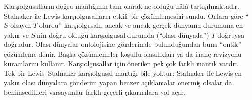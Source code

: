 Karşıolgusalların doğru mantığının tam olarak ne olduğu hâlâ tartışılmaktadır.
Stalnaker ile Lewis karşıolgusalların etkili bir çözümlemesini sundu. Onlara
göre ``$S$ olsaydı $T$ olurdu'' karşıolgusalı, ancak ve ancak gerçek dünyanın
durumuna en yakın ve $S$'nin doğru olduğu karşıolgusal durumda (``olası
dünyada'') $T$ doğruysa doğrudur. Olası dünyalar ontolojisine gönderimde
bulunduğundan buna ``ontik'' çözümleme denir. Başka çözümlemeler koşullu
olasılıkları ya da inanç revizyonu kuramlarını kullanır. Karşıolgusallar için
önerilen pek çok farklı mantık vardır. Tek bir Lewis--Stalnaker karşıolgusal
mantığı bile yoktur: Stalnaker ile Lewis en yakın olası dünyalara gönderim
yapan benzer açıklamalar önermiş olsalar da benimsedikleri varsayımlar farklı
geçerli çıkarımlara yol açar.

